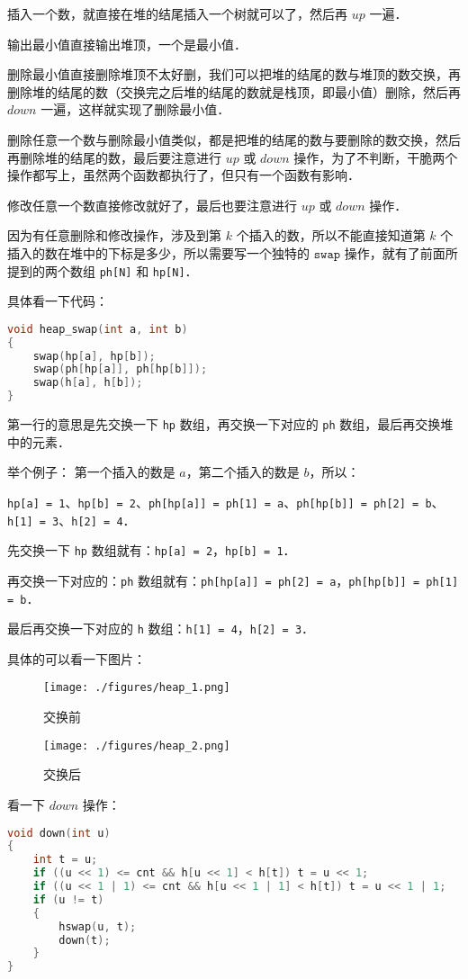 插入一个数，就直接在堆的结尾插入一个树就可以了，然后再 $up$ 一遍．

输出最小值直接输出堆顶，一个是最小值．

删除最小值直接删除堆顶不太好删，我们可以把堆的结尾的数与堆顶的数交换，再删除堆的结尾的数（交换完之后堆的结尾的数就是栈顶，即最小值）删除，然后再 $down$ 一遍，这样就实现了删除最小值．

删除任意一个数与删除最小值类似，都是把堆的结尾的数与要删除的数交换，然后再删除堆的结尾的数，最后要注意进行 $up$ 或 $down$ 操作，为了不判断，干脆两个操作都写上，虽然两个函数都执行了，但只有一个函数有影响．

修改任意一个数直接修改就好了，最后也要注意进行 $up$ 或 $down$ 操作．

因为有任意删除和修改操作，涉及到第 $k$ 个插入的数，所以不能直接知道第 $k$ 个插入的数在堆中的下标是多少，所以需要写一个独特的 $\mathtt{swap}$ 操作，就有了前面所提到的两个数组 \verb|ph[N]| 和 \verb|hp[N]|．

具体看一下代码：

\begin{lstlisting}[language=cpp]
void heap_swap(int a, int b)
{
    swap(hp[a], hp[b]);
    swap(ph[hp[a]], ph[hp[b]]);
    swap(h[a], h[b]);
}
\end{lstlisting}

第一行的意思是先交换一下 \verb|hp| 数组，再交换一下对应的 \verb|ph| 数组，最后再交换堆中的元素．

举个例子：
第一个插入的数是 $a$，第二个插入的数是 $b$，所以：

\verb|hp[a] = 1|、\verb|hp[b] = 2|、\verb|ph[hp[a]] = ph[1] = a|、\verb|ph[hp[b]] = ph[2] = b|、\verb|h[1] = 3|、\verb|h[2] = 4|．

先交换一下 \verb|hp| 数组就有：\verb|hp[a] = 2|，\verb|hp[b] = 1|．

再交换一下对应的：\verb|ph| 数组就有：\verb|ph[hp[a]] = ph[2] = a|，\verb|ph[hp[b]] = ph[1] = b|．

最后再交换一下对应的 \verb|h| 数组：\verb|h[1] = 4|，\verb|h[2] = 3|．

具体的可以看一下图片：
\begin{figure}[ht]
\centering
\texttt{[image: ./figures/heap\_1.png]}
\caption{交换前} \label{heap_fig1}
\end{figure}

\begin{figure}[ht]
\centering
\texttt{[image: ./figures/heap\_2.png]}
\caption{交换后} \label{heap_fig2}
\end{figure}

看一下 $down$ 操作：

\begin{lstlisting}[language=cpp]
void down(int u)
{
    int t = u;
    if ((u << 1) <= cnt && h[u << 1] < h[t]) t = u << 1;
    if ((u << 1 | 1) <= cnt && h[u << 1 | 1] < h[t]) t = u << 1 | 1;
    if (u != t)
    {
        hswap(u, t);
        down(t);
    }
}
\end{lstlisting}